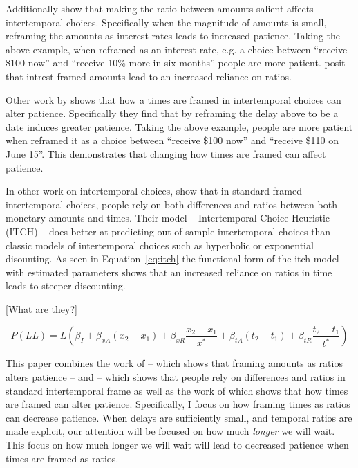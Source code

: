 \documentclass[]{article}
\begin{document}
Additionally  show that making the ratio between amounts salient affects intertemporal choices. 
Specifically when the magnitude of amounts is small, reframing the amounts as interest rates leads to increased patience. Taking the above example, when reframed as an interest rate, e.g.  a choice between  ``receive \$100 now'' and ``receive 10\% more in six months'' people are more patient.  posit that intrest framed amounts lead to an increased reliance on ratios.

Other work by  shows that how a times are framed in intertemporal choices can alter patience. 
Specifically they find that by reframing the delay above to be a date induces greater patience. 
Taking the above example, people are more patient when reframed it as a choice between  ``receive \$100 now'' and ``receive \$110 on June 15''.
This demonstrates that changing how times are framed can affect patience. 

In other work on intertemporal choices,  show that in  standard framed intertemporal choices, people rely on both differences and ratios between both monetary amounts and times.
 Their model -- Intertemporal Choice Heuristic (ITCH) -- does better at predicting out of sample intertemporal choices than classic models of intertemporal choices such as hyperbolic or exponential disounting. 
As seen in Equation~\ref{eq:itch}  the functional form of the itch model with estimated parameters shows that an increased reliance on ratios in time leads to steeper discounting. 

[What are they?]
 
 \begin{equation}\label{eq:itch}
 P(LL) = L \left(\beta_I + \beta_{xA}(x_2 - x_1) + \beta_{xR} \frac{x_2 - x_1}{x^*} + \beta_{tA}(t_2 - t_1) + \beta_{tR} \frac{t_2 - t_1}{t^*}\right)
 \end{equation}
 

This paper combines the work of  -- which shows that framing amounts as ratios alters patience -- and  -- which shows that people rely on differences and ratios in standard intertemporal frame as well as the work  of   which shows that how times are framed can alter patience. 
Specifically, I focus on how framing times as ratios can decrease patience.
When delays are sufficiently small, and temporal ratios are made explicit, our attention will be focused on how much \textit{longer} we will wait. 
This focus on how much longer we will wait will lead to decreased patience when times are framed as ratios.
\end{document}
